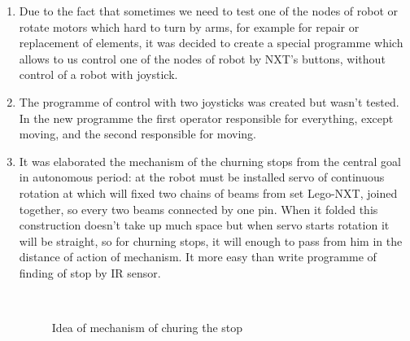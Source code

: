 \begin{enumerate}
\begin{enumerate}
		\item Due to the fact that sometimes we need to test one of the nodes of robot or rotate motors which hard to turn by arms, for example for repair or replacement of elements, it was decided to create a special programme which allows to us control one of the nodes of robot by NXT's buttons, without control of a robot with joystick.
		
		\item The programme of control with two joysticks was created but wasn't tested. In the new programme the first operator responsible for everything, except moving, and the second responsible for moving.
		
		\item It was elaborated the mechanism of the churning stops from the central goal in autonomous period: at the robot must be installed servo of continuous rotation at which will fixed two chains of beams from set Lego-NXT, joined together, so every two beams connected by one pin. When it folded this construction doesn't take up much space but when servo starts rotation it will be straight, so for churning stops, it will enough to pass from him in the distance of action of mechanism. It more easy than write programme of finding of stop by IR sensor.
		
		\begin{figure}[H]
			\begin{minipage}[h]{0.2\linewidth}
				\center  
			\end{minipage}
			\begin{minipage}[h]{0.6\linewidth}
				\caption{Idea of mechanism of churing the stop}
			\end{minipage}
		\end{figure}
		

\end{enumerate}
\end{enumerate}
